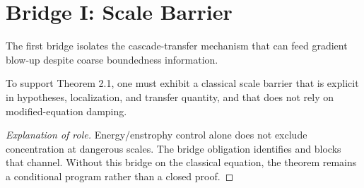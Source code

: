 \section{Bridge I: Scale Barrier}

The first bridge isolates the cascade-transfer mechanism that can feed gradient blow-up despite coarse boundedness information.

\begin{proposition}
To support Theorem 2.1, one must exhibit a classical scale barrier that is explicit in hypotheses, localization, and transfer quantity, and that does not rely on modified-equation damping.
\end{proposition}

\begin{proof}[Explanation of role]
Energy/enstrophy control alone does not exclude concentration at dangerous scales. The bridge obligation identifies and blocks that channel. Without this bridge on the classical equation, the theorem remains a conditional program rather than a closed proof.
\end{proof}
